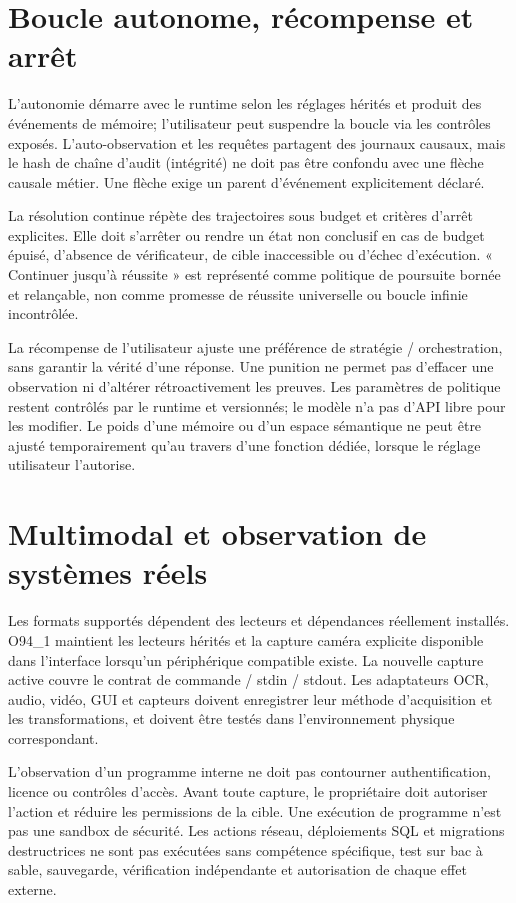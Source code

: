 \documentclass[11pt,a4paper]{article}
\begin{document}
\section{Boucle autonome, récompense et arrêt}
L'autonomie démarre avec le runtime selon les réglages hérités et produit des événements de mémoire; l'utilisateur peut suspendre la boucle via les contrôles exposés. L'auto-observation et les requêtes partagent des journaux causaux, mais le hash de chaîne d'audit (intégrité) ne doit pas être confondu avec une flèche causale métier. Une flèche exige un parent d'événement explicitement déclaré.

La résolution continue répète des trajectoires sous budget et critères d'arrêt explicites. Elle doit s'arrêter ou rendre un état non conclusif en cas de budget épuisé, d'absence de vérificateur, de cible inaccessible ou d'échec d'exécution. « Continuer jusqu'à réussite » est représenté comme politique de poursuite bornée et relançable, non comme promesse de réussite universelle ou boucle infinie incontrôlée.

La récompense de l'utilisateur ajuste une préférence de stratégie / orchestration, sans garantir la vérité d'une réponse. Une punition ne permet pas d'effacer une observation ni d'altérer rétroactivement les preuves. Les paramètres de politique restent contrôlés par le runtime et versionnés; le modèle n'a pas d'API libre pour les modifier. Le poids d'une mémoire ou d'un espace sémantique ne peut être ajusté temporairement qu'au travers d'une fonction dédiée, lorsque le réglage utilisateur l'autorise.

\section{Multimodal et observation de systèmes réels}
Les formats supportés dépendent des lecteurs et dépendances réellement installés. O94\_1 maintient les lecteurs hérités et la capture caméra explicite disponible dans l'interface lorsqu'un périphérique compatible existe. La nouvelle capture active couvre le contrat de commande / stdin / stdout. Les adaptateurs OCR, audio, vidéo, GUI et capteurs doivent enregistrer leur méthode d'acquisition et les transformations, et doivent être testés dans l'environnement physique correspondant.

L'observation d'un programme interne ne doit pas contourner authentification, licence ou contrôles d'accès. Avant toute capture, le propriétaire doit autoriser l'action et réduire les permissions de la cible. Une exécution de programme n'est pas une sandbox de sécurité. Les actions réseau, déploiements SQL et migrations destructrices ne sont pas exécutées sans compétence spécifique, test sur bac à sable, sauvegarde, vérification indépendante et autorisation de chaque effet externe.
\end{document}
